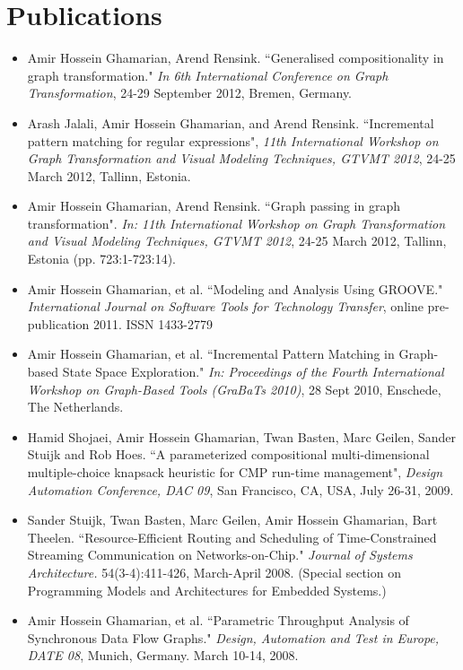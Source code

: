 \section{Publications}
\begin{itemize}
\item Amir Hossein Ghamarian, Arend Rensink. ``Generalised compositionality in graph transformation." \emph{In 6th International Conference on Graph Transformation}, 24-29 September 2012, Bremen, Germany.
\item Arash Jalali, Amir Hossein Ghamarian, and Arend Rensink. ``Incremental pattern matching for regular expressions", \emph{11th International Workshop on Graph Transformation and Visual Modeling Techniques, GTVMT 2012}, 24-25 March 2012, Tallinn, Estonia.
\item Amir Hossein Ghamarian, Arend Rensink. ``Graph passing in graph transformation". \emph{In: 11th International Workshop on Graph Transformation and Visual Modeling Techniques, GTVMT 2012}, 24-25 March 2012, Tallinn, Estonia (pp. 723:1-723:14).
\item Amir Hossein Ghamarian, et al. ``Modeling and Analysis Using GROOVE." \emph{
International Journal on Software Tools for Technology Transfer},
online pre-publication 2011. ISSN 1433-2779

\item Amir Hossein Ghamarian, et al. ``Incremental
Pattern Matching in Graph-based State Space Exploration." \emph{In: Proceedings of the Fourth
International Workshop on Graph-Based Tools (GraBaTs 2010)}, 28 Sept 2010, Enschede, The Netherlands.

\item Hamid Shojaei, Amir Hossein Ghamarian, Twan Basten, Marc Geilen, Sander Stuijk and Rob Hoes.
``A parameterized compositional multi-dimensional multiple-choice knapsack heuristic for CMP run-time management",
\emph{Design Automation Conference, DAC 09}, San Francisco, CA, USA, July 26-31, 2009.

\item Sander Stuijk, Twan Basten, Marc Geilen, Amir Hossein Ghamarian, Bart Theelen.
``Resource-Efficient Routing and Scheduling of Time-Constrained
Streaming Communication on Networks-on-Chip." \emph{Journal of
Systems Architecture.} 54(3-4):411-426, March-April 2008. (Special
section on Programming Models and Architectures for Embedded
Systems.)

\item Amir Hossein Ghamarian, et al. ``Parametric Throughput Analysis of
Synchronous Data Flow Graphs." \emph{Design, Automation and Test in
Europe, DATE 08}, Munich, Germany. March 10-14, 2008.


\end{itemize}
